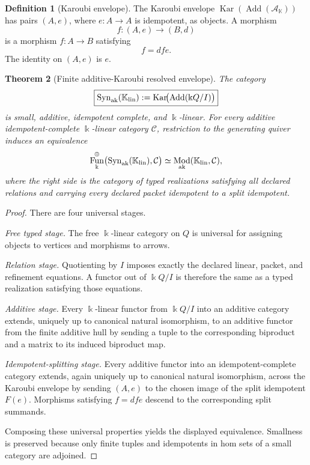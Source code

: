 \documentclass[11pt]{article}
\newtheorem{theorem}{Theorem}[section]
\theoremstyle{definition}
\newtheorem{definition}[theorem]{Definition}
\theoremstyle{remark}
\DeclareMathOperator{\Kar}{Kar}
\DeclareMathOperator{\Add}{Add}
\DeclareMathOperator{\Mod}{Mod}
\DeclareMathOperator{\Fun}{Fun}
\newcommand{\kk}{\Bbbk}
\newcommand{\Syn}{\operatorname{Syn}}
\begin{document}
\begin{definition}[Karoubi envelope]
\label{def:karoubi-envelope-expanded}
The Karoubi envelope \(\Kar(\Add(\mathcal A_{\mathbb K}))\) has pairs \((A,e)\), where \(e:A\to A\) is idempotent, as objects.  A morphism
\[
f:(A,e)\longrightarrow(B,d)
\]
is a morphism \(f:A\to B\) satisfying
\[
f=dfe.
\]
The identity on \((A,e)\) is \(e\).
\end{definition}

\begin{theorem}[Finite additive-Karoubi resolved envelope]
\label{thm:additive-karoubi-envelope}
The category
\[
\boxed{
\Syn_{\mathrm{ak}}(\mathbb K_{\rm lin})
:=
\Kar\!\bigl(\Add(\kk Q/I)\bigr)}
\]
is small, additive, idempotent complete, and \(\kk\)-linear.  For every additive idempotent-complete \(\kk\)-linear category \(\mathcal C\), restriction to the generating quiver induces an equivalence
\[
\Fun_{\kk}^{\oplus}
\bigl(\Syn_{\mathrm{ak}}(\mathbb K_{\rm lin}),\mathcal C\bigr)
\simeq
\Mod_{\mathrm{ak}}(\mathbb K_{\rm lin},\mathcal C),
\]
where the right side is the category of typed realizations satisfying all declared relations and carrying every declared packet idempotent to a split idempotent.
\end{theorem}

\begin{proof}
There are four universal stages.

\emph{Free typed stage.}  The free \(\kk\)-linear category on \(Q\) is universal for assigning objects to vertices and morphisms to arrows.

\emph{Relation stage.}  Quotienting by \(I\) imposes exactly the declared linear, packet, and refinement equations.  A functor out of \(\kk Q/I\) is therefore the same as a typed realization satisfying those equations.

\emph{Additive stage.}  Every \(\kk\)-linear functor from \(\kk Q/I\) into an additive category extends, uniquely up to canonical natural isomorphism, to an additive functor from the finite additive hull by sending a tuple to the corresponding biproduct and a matrix to its induced biproduct map.

\emph{Idempotent-splitting stage.}  Every additive functor into an idempotent-complete category extends, again uniquely up to canonical natural isomorphism, across the Karoubi envelope by sending \((A,e)\) to the chosen image of the split idempotent \(F(e)\).  Morphisms satisfying \(f=dfe\) descend to the corresponding split summands.

Composing these universal properties yields the displayed equivalence.  Smallness is preserved because only finite tuples and idempotents in hom sets of a small category are adjoined.
\end{proof}
\end{document}
